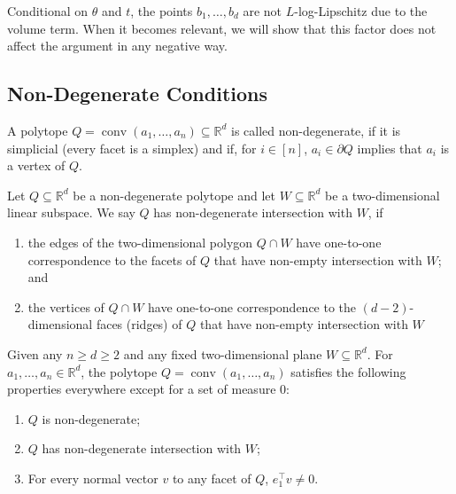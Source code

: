 \documentclass{article}\usepackage[a4paper,margin=20mm]{geometry}
\newcommand{\R}{\mathbb R}
\newcommand{\T}{\top}
\newcommand{\conv}{\operatorname{conv}}
\renewcommand{\subset}{\subseteq}
\begin{document}
Conditional on $\theta$ and $t$, the points $b_1,\dots,b_d$ are not $L$-log-Lipschitz due to the volume term.
When it becomes relevant, we will show that this factor does not affect the argument in any negative way.

\subsection{Non-Degenerate Conditions}

\begin{definition}\label{def:non-degeneracy}
    A polytope $Q = \conv(a_1,\dots,a_n) \subset \R^d$ is called non-degenerate, if it is simplicial (every facet is a simplex) and if, for $i \in [n]$,
    $a_i \in \partial Q$ implies that $a_i$ is a vertex of $Q$.
\end{definition}

\begin{definition}\label{def:non-degenerate-intersection}
    Let $Q \subset \R^d$ be a non-degenerate polytope and let $W \subset \R^d$ be a two-dimensional linear subspace.
    We say $Q$ has non-degenerate intersection with $W$, if 
    \begin{enumerate}
        \item the edges of the two-dimensional polygon $Q \cap W$ have one-to-one correspondence to the facets of $Q$ that have non-empty intersection with $W$; and
        \item the vertices of $Q \cap W$ have one-to-one correspondence to the $(d-2)$-dimensional faces (ridges) of $Q$ that have non-empty intersection with $W$
    \end{enumerate}
\end{definition}

\begin{fact}\label{lem:non-degeneracy}
    Given any $n \geq d \geq 2$ and any fixed two-dimensional plane $W \subset \R^d$.
    For $a_1, \ldots, a_n \in \R^d$,
    the polytope $Q = \conv(a_1, \ldots, a_n)$ satisfies the following properties
    everywhere except for a set of measure $0$:
    \begin{enumerate}
        \item $Q$ is non-degenerate;
        \item $Q$ has non-degenerate intersection with $W$;
        \item For every normal vector $v$ to any facet of $Q$, $e_1^\T v \neq 0$.
    \end{enumerate}
\end{fact}
\end{document}
